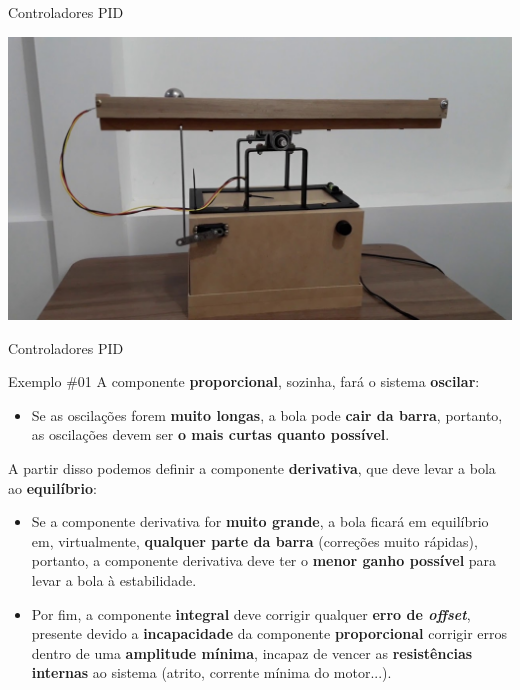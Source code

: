 \begin{frame}{Controladores PID}
	
\centering
\includegraphics[width=0.9\linewidth]{Figuras/Ch13/fig3}

\end{frame}


\begin{frame}{Controladores PID}
	\begin{block}{Exemplo \#01}
		A componente \textbf{proporcional}, sozinha, fará o sistema \textbf{oscilar}:
		\begin{itemize}
			\item Se as oscilações forem \textbf{muito longas}, a bola pode \textbf{cair da barra}, portanto, as oscilações devem ser \textbf{o mais curtas quanto possível}.
		\end{itemize}
		A partir disso podemos definir a componente \textbf{derivativa}, que deve levar a bola ao \textbf{equilíbrio}:
		\begin{itemize}
			\item Se a componente derivativa for \textbf{muito grande}, a bola ficará em equilíbrio em, virtualmente, \textbf{qualquer parte da barra} (correções muito rápidas), portanto, a componente derivativa deve ter o \textbf{menor ganho possível} para levar a bola à estabilidade.
		\end{itemize}
		
		\begin{itemize}
			\item Por fim, a componente \textbf{integral} deve corrigir qualquer \textbf{erro de \textit{offset}}, presente devido a \textbf{incapacidade} da componente \textbf{proporcional} corrigir erros dentro de uma \textbf{amplitude mínima}, incapaz de vencer as \textbf{resistências internas} ao sistema (atrito, corrente mínima do motor...).
		\end{itemize}
	\end{block}
\end{frame}


